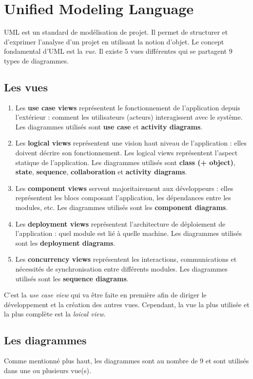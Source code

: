\documentclass{article}
\begin{document}
\section{Unified Modeling Language}
	UML est un standard de modélisation de projet. Il permet de structurer et d'exprimer l'analyse d'un projet en utilisant la notion d'objet. Le concept fondamental d'UML est la \textit{vue}.
	Il existe 5 vues différentes qui se partagent 9 types de diagrammes.

	\subsection{Les vues}
		\begin{enumerate}
			\item Les \textbf{use case views} représentent le fonctionnement de l'application depuis l'extérieur : comment les utilisateurs (acteurs) interagissent avec le système.
				Les diagrammes utilisés sont \textbf{use case} et \textbf{activity diagrams}.
			\item Les \textbf{logical views} représentent une vision haut niveau de l'application : elles doivent décrire son fonctionnement. Les logical views représentent l'aspect
				statique de l'application. Les diagrammes utilisés sont \textbf{class (+ object)}, \textbf{state}, \textbf{sequence}, \textbf{collaboration} et \textbf{activity diagrams}.
			\item Les \textbf{component views} servent majoritairement aux développeurs : elles représentent les blocs composant l'application, les dépendances entre les modules, etc.
				Les diagrammes utilisés sont les \textbf{component diagrams}.
			\item Les \textbf{deployment views} représentent l'architecture de déploiement de l'application : quel module est lié à quelle machine.
				Les diagrammes utilisés sont les \textbf{deployment diagrams}.
			\item Les \textbf{concurrency views} représentent les interactions, communications et nécessités de synchronisation entre différents modules.
				Les diagrammes utilisés sont les \textbf{sequence diagrams}.
		\end{enumerate}

		C'est la \textit{use case view} qui va être faite en première afin de diriger le développement et la création des autres vues. Cependant, la vue la plus utilisée et la plus complète
		est la \textit{loical view}.

	\subsection{Les diagrammes}
		Comme mentionné plus haut, les diagrammes sont au nombre de 9 et sont utilisés dans une ou plusieurs vue(s).
\end{document}
